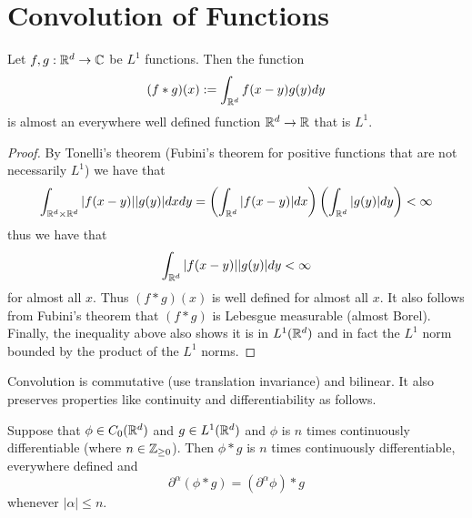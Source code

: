 \documentclass[twoside, a4paper, 10pt]{amsart}
\begin{document}
\section{Convolution of Functions}

\begin{prop}\label{prop: convolution of L1 is L1} Let $f,g:\mathbb{R}^d \to \mathbb{C}$ be $L^1$ functions. Then the function $$(f * g) (x) := \int_{\mathbb{R}^d} f(x-y)g(y) dy$$ is almost an everywhere well defined function $\mathbb{R}^d \to \mathbb{R}$ that is $L^1$.

\end{prop}

\begin{proof} By Tonelli's theorem (Fubini's theorem for positive functions that are not necessarily $L^1$) we have that $$\int_{\mathbb{R}^d \times \mathbb{R}^d} |f(x-y)||g(y)|dx dy = \left(\int_{\mathbb{R}^d} |f(x-y)| dx \right) \left( \int_{\mathbb{R}^d} |g(y)| dy \right) < \infty$$ thus we have that $$\int_{\mathbb{R}^d} |f(x-y)||g(y)| dy < \infty$$ for almost all $x$. Thus $(f*g)(x)$ is well defined for almost all $x$. It also follows from Fubini's theorem that $(f*g)$ is Lebesgue measurable (almost Borel). Finally, the inequality above also shows it is in $L^1(\mathbb{R}^d)$ and in fact the $L^1$ norm bounded by the product of the $L^1$ norms. \end{proof}

Convolution is commutative (use translation invariance) and bilinear. It also preserves properties like continuity and differentiability as follows.

\begin{prop} Suppose that $\phi \in C_0(\mathbb{R}^d)$ and $ g \in L^1(\mathbb{R}^d)$ and $\phi$ is $n$ times continuously differentiable (where $n \in \mathbb{Z}_{\geq 0}$). Then $\phi*g$ is $n$ times continuously differentiable, everywhere defined and $$\partial^{\alpha} (\phi * g) = (\partial^{\alpha} \phi) * g$$ whenever $|\alpha|\leq n$.

\end{prop}
\end{document}

